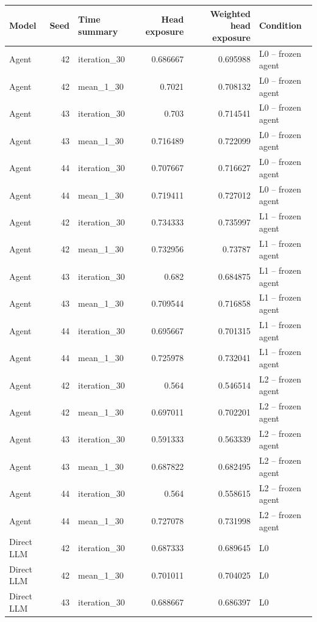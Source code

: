 \begin{table}[htbp!]
\centering
\small
\setlength{\tabcolsep}{3pt}
\renewcommand{\arraystretch}{1.1}
\begin{tabular}{lrlrrl}
\hline
Model & Seed & Time summary & Head exposure & Weighted head exposure & Condition \\
\hline
Agent & 42 & iteration\_30 & 0.686667 & 0.695988 & L0 -- frozen agent \\
Agent & 42 & mean\_1\_30 & 0.7021 & 0.708132 & L0 -- frozen agent \\
Agent & 43 & iteration\_30 & 0.703 & 0.714541 & L0 -- frozen agent \\
Agent & 43 & mean\_1\_30 & 0.716489 & 0.722099 & L0 -- frozen agent \\
Agent & 44 & iteration\_30 & 0.707667 & 0.716627 & L0 -- frozen agent \\
Agent & 44 & mean\_1\_30 & 0.719411 & 0.727012 & L0 -- frozen agent \\
Agent & 42 & iteration\_30 & 0.734333 & 0.735997 & L1 -- frozen agent \\
Agent & 42 & mean\_1\_30 & 0.732956 & 0.73787 & L1 -- frozen agent \\
Agent & 43 & iteration\_30 & 0.682 & 0.684875 & L1 -- frozen agent \\
Agent & 43 & mean\_1\_30 & 0.709544 & 0.716858 & L1 -- frozen agent \\
Agent & 44 & iteration\_30 & 0.695667 & 0.701315 & L1 -- frozen agent \\
Agent & 44 & mean\_1\_30 & 0.725978 & 0.732041 & L1 -- frozen agent \\
Agent & 42 & iteration\_30 & 0.564 & 0.546514 & L2 -- frozen agent \\
Agent & 42 & mean\_1\_30 & 0.697011 & 0.702201 & L2 -- frozen agent \\
Agent & 43 & iteration\_30 & 0.591333 & 0.563339 & L2 -- frozen agent \\
Agent & 43 & mean\_1\_30 & 0.687822 & 0.682495 & L2 -- frozen agent \\
Agent & 44 & iteration\_30 & 0.564 & 0.558615 & L2 -- frozen agent \\
Agent & 44 & mean\_1\_30 & 0.727078 & 0.731998 & L2 -- frozen agent \\
Direct LLM & 42 & iteration\_30 & 0.687333 & 0.689645 & L0 \\
Direct LLM & 42 & mean\_1\_30 & 0.701011 & 0.704025 & L0 \\
Direct LLM & 43 & iteration\_30 & 0.688667 & 0.686397 & L0 \\

\end{tabular}
\end{table}
